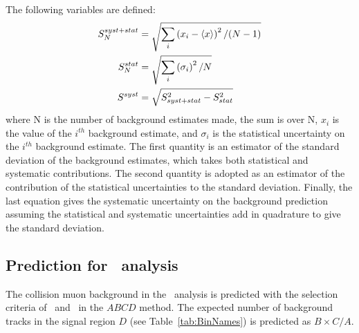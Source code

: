The following variables are defined:
\begin{equation}
\centering
\begin{split}
S^{syst+stat}_{N} &= \sqrt{\sum_i \left( x_i - \langle x \rangle  \right) ^2/(N-1)} \\
S^{stat}_{N} &= \sqrt{\sum_i \left( \sigma _i \right) ^2/N} \\
S^{syst} &= \sqrt{S_{syst+stat}^2-S_{stat}^2} \\
\end{split}
\label{eq:variance}
\end{equation}
where N is the number of background estimates made,
the sum is over N, $x_i$ is the value of the $i^{th}$ background estimate,
and $\sigma_i$ is the statistical uncertainty on
the $i^{th}$ background estimate. The first quantity is an estimator of the
standard deviation of the background estimates, which takes both statistical
and systematic contributions. The second quantity is adopted as an
estimator of the contribution of the statistical uncertainties
to the standard deviation. Finally, the last equation gives the systematic uncertainty on the background prediction assuming
the statistical and systematic uncertainties add in quadrature to give the standard deviation.

\subsection{Prediction for \muononly\ analysis \label{sec:MuOnlyPred}}

The collision muon  background in the \muononly\ analysis is predicted with the selection criteria of \invbeta\ and \pt\ in the $ABCD$  method.
The expected number of background tracks in the signal region $D$ (see Table~\ref{tab:BinNames}) is predicted as $B \times C / A$. 

